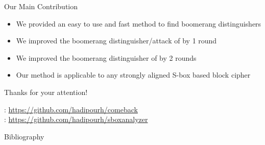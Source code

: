 \documentclass[table,aspectratio=169]{beamer}
\begin{document}
\begin{frame}{Our Main Contribution}
\begin{itemize}
\item[\faDiamond] We provided an easy to use and fast method to find boomerang distinguishers
\item[\faDiamond] We improved the boomerang distinguisher/attack of  by 1 round
\item[\faDiamond] We improved the boomerang distinguisher of  by 2 rounds  
\item[\faDiamond] Our method is applicable to any strongly aligned S-box based block cipher
\end{itemize}

\begin{center}
\vspace{0.44cm}
{\large Thanks for your attention!}
\vspace{0.4cm}

\faGithub: \url{https://github.com/hadipourh/comeback}\\
\vspace{0.35cm}
\faGithub: \url{https://github.com/hadipourh/sboxanalyzer}
\end{center}
\end{frame}


\begin{frame}[allowframebreaks]{Bibliography}
  \printbibliography
\end{frame}
\end{document}
